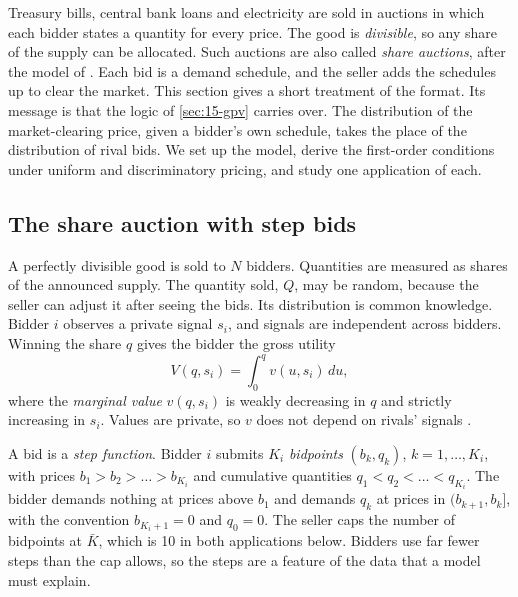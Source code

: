 Treasury bills, central bank loans and electricity are sold in auctions in which each bidder states a
quantity for every price. The good is \emph{divisible}, so any share of the supply can be allocated. Such
auctions are also called \emph{share auctions}, after the model of \citet{Wilson1979}. Each bid is a demand
schedule, and the seller adds the schedules up to clear the market. This section gives a short treatment of
the format. Its message is that the logic of \cref{sec:15-gpv} carries over. The distribution of the
market-clearing price, given a bidder's own schedule, takes the place of the distribution of rival bids. We
set up the model, derive the first-order conditions under uniform and discriminatory pricing, and study one
application of each.

\subsection{The share auction with step bids}\label{sec:15-div-model}

A perfectly divisible good is sold to $N$ bidders. Quantities are measured as shares of the announced
supply. The quantity sold, $Q$, may be random, because the seller can adjust it after seeing the
bids. Its distribution is common knowledge. Bidder $i$ observes a private signal $s_i$, and signals are
independent across bidders. Winning the share $q$ gives the bidder the gross utility
\begin{equation}\label{eq:15-div-V}
V(q,s_i)=\int_0^q v(u,s_i)\,du ,
\end{equation}
where the \emph{marginal value} $v(q,s_i)$ is weakly decreasing in $q$ and strictly increasing in $s_i$.
Values are private, so $v$ does not depend on rivals' signals \citep[p.~978 and Assumptions~2 and 6]{Kastl2011}.

A bid is a \emph{step function}. Bidder $i$ submits $K_i$ \emph{bidpoints} $(b_k,q_k)$, $k=1,\dots,K_i$,
with prices $b_1>b_2>\dots>b_{K_i}$ and cumulative quantities $q_1<q_2<\dots<q_{K_i}$. The bidder demands
nothing at prices above $b_1$ and demands $q_k$ at prices in $(b_{k+1},b_k]$, with the convention
$b_{K_i+1}=0$ and $q_0=0$. The seller caps the number of bidpoints at $\bar K$, which is 10 in both
applications below. Bidders use far fewer steps than the cap allows, so the steps are a feature of the data
that a model must explain.

